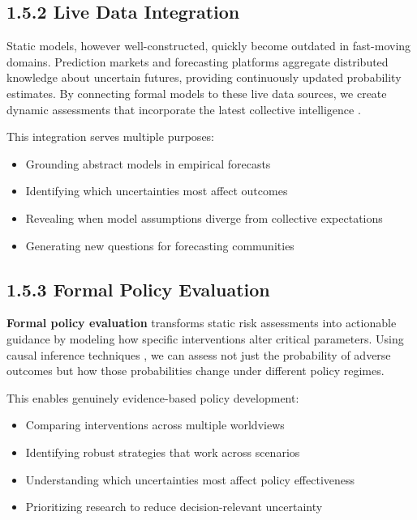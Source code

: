 \documentclass[
  11pt,
  letterpaper,
]{book}
\providecommand{\tightlist}{%
  \setlength{\itemsep}{0pt}\setlength{\parskip}{0pt}}
\begin{document}
\subsection{1.5.2 Live Data Integration}\label{live-data-integration}

Static models, however well-constructed, quickly become outdated in
fast-moving domains. Prediction markets and forecasting platforms
aggregate distributed knowledge about uncertain futures, providing
continuously updated probability estimates. By connecting formal models
to these live data sources, we create dynamic assessments that
incorporate the latest collective intelligence \textcite{tetlock2015}.

This integration serves multiple purposes:

\begin{itemize}
\tightlist
\item
  Grounding abstract models in empirical forecasts
\item
  Identifying which uncertainties most affect outcomes
\item
  Revealing when model assumptions diverge from collective expectations
\item
  Generating new questions for forecasting communities
\end{itemize}

\subsection{1.5.3 Formal Policy
Evaluation}\label{formal-policy-evaluation}

\textbf{Formal policy evaluation} transforms static risk assessments
into actionable guidance by modeling how specific interventions alter
critical parameters. Using causal inference techniques
\textcite{pearl2000} \textcite{pearl2009}, we can assess not just the
probability of adverse outcomes but how those probabilities change under
different policy regimes.

This enables genuinely evidence-based policy development:

\begin{itemize}
\tightlist
\item
  Comparing interventions across multiple worldviews
\item
  Identifying robust strategies that work across scenarios
\item
  Understanding which uncertainties most affect policy effectiveness
\item
  Prioritizing research to reduce decision-relevant uncertainty
\end{itemize}
\end{document}
